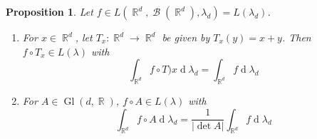 \documentclass[12pt, a4paper]{memoir}
\DeclareMathOperator{\R}{{\mathbb{R}}}
\newtheorem{proposition}[theorem]{Proposition}
\theoremstyle{nonumberplain}
\DeclareMathOperator{\Gl}{Gl}
\DeclareMathOperator{\B}{\mathcal{B}}
\renewcommand{\d}[1]{\ensuremath{\operatorname{d}\!{#1}}} %
\begin{document}
\begin{proposition}
    Let $f\in L(\R^d,\B(\R^d),\lambda_d)=L(\lambda_d)$.
    \begin{enumerate}[nolistsep,label=(\roman*)]
        \item For $x\in\R^d$, let $T_x:\R^d\to\R^d$ be given by $T_x(y)=x+y$.
            Then $f\circ T_x\in L(\lambda)$ with
            \begin{equation*}
                \int_{\R^d}f\circ T)x\d{\lambda_d}=\int_{\R^d}f\d{\lambda_d}
            \end{equation*}
        \item For $A\in\Gl(d,\R)$, $f\circ A\in L(\lambda)$ with
            \begin{equation*}
                \int_{\R^d}f\circ A\d{\lambda_d}=\frac{1}{|\det A|}\int_{\R^d}f\d{\lambda_d}
            \end{equation*}
    \end{enumerate}
\end{proposition}
\end{document}
